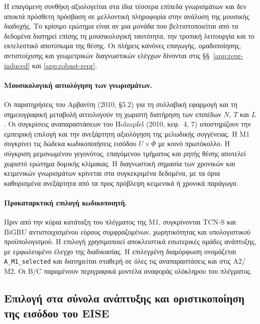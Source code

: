 \documentclass[11pt,a4paper]{article}
\begin{document}
Η επαγόμενη συνθήκη αξιολογείται στα ίδια τέσσερα επίπεδα γνωρισμάτων και δεν αποκτά πρόσθετη πρόσβαση σε μελλοντική πληροφορία στην ανάλυση της μουσικής διαδοχής. Το κρίσιμο ερώτημα είναι αν μια μονάδα που βελτιστοποιείται από τα δεδομένα διατηρεί επίσης τη μουσικολογική ταυτότητα, την τροπική λειτουργία και το εκτελεστικό αποτύπωμα της θέσης. Οι πλήρεις κανόνες επαγωγής, ομαδοποίησης, αντιστοίχισης και γεωμετρικών διαγνωστικών ελέγχων δίνονται στις §§~\ref{app:repr-induced} και \ref{app:robust-repr}.

\paragraph{Μουσικολογική αιτιολόγηση των γνωρισμάτων.} Οι παρατηρήσεις του Αρβανίτη (2010, §5.2) για τη συλλαβική εφαρμογή και τη σημειογραφική μεταβολή αιτιολογούν τη χωριστή διατήρηση των επιπέδων $N$, $T$ και $L$. Οι συγκρίσεις αναπαραστάσεων του Holzapfel (2010, κεφ.~4, 7) υποστηρίζουν την εμπειρική επιλογή και την ανεξάρτητη αξιολόγηση της μελωδικής συγγένειας. Η M1 συγκρίνει τις δώδεκα κωδικοποιήσεις εισόδου $U\times\Phi$ με κοινό πρωτόκολλο. Η σύγκριση μεμονωμένου γεγονότος, επαγόμενου τμήματος και ρητής θέσης αποτελεί χωριστό ερώτημα δομικής κλίμακας. Η διαγνωστική σημασία των χρονικών και κειμενικών γνωρισμάτων κρίνεται στα συγκεκριμένα δεδομένα, με τα όρια καθορισμένα ανεξάρτητα από τα προς πρόβλεψη κειμενικά ή χρονικά παράγωγα.

\paragraph{Προκαταρκτική επιλογή κωδικοποιητή.} Πριν από την κύρια κατάταξη του πλέγματος της Μ1, συγκρίνονται TCN-S και BiGRU αντιστοιχισμένου εύρους συμφραζομένων, χωρητικότητας και υπολογιστικού προϋπολογισμού. Η επιλογή χρησιμοποιεί αποκλειστικά εσωτερικές ομάδες ανάπτυξης, με εμφωλευμένο έλεγχο της διαδικασίας. Η επιλεγμένη διαμόρφωση ονομάζεται \texttt{A\_M1\_selected} και διατηρείται σταθερή σε όλες τις αναπαραστάσεις και στις Α2/Μ2. Οι B/C παραμένουν περιγραφικά μοντέλα αναφοράς ολόκληρου του πλέγματος.

\subsection{Επιλογή στα σύνολα ανάπτυξης και οριστικοποίηση της εισόδου του EISE}
\end{document}
